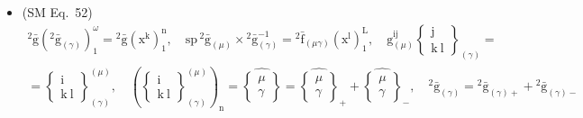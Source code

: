 \documentclass[
    12pt,              %
    a4paper,           %
    headings=normal,   %
    twoside=true,      %
    BCOR=8mm,          %
]{scrbook}
\begin{document}
\begin{itemize}[label={},leftmargin=0pt]
    \item (SM Eq.\ 52) 
    \[
    \begin{gathered}
    {}^2\bar{\mathrm{g}} \left( {}^2\bar{\mathrm{g}}_{(\gamma)} \right)_1^\omega = {}^2\bar{\mathrm{g}}(\mathrm{x^k})_1^\mathrm{n}, \quad \mathrm{sp} \, {}^2\bar{\mathrm{g}}_{(\mu)} \times {}^2\bar{\mathrm{g}}_{(\gamma)}^{-1} = {}^2\bar{\mathrm{f}}_{(\mu\gamma)} (\mathrm{x^l})_1^\mathrm{L}, \quad \mathrm{g}_{(\mu)}^{\mathrm{ij}} \left\{ \begin{smallmatrix} \mathrm{j} \\ \mathrm{k\ l} \end{smallmatrix} \right\}_{(\gamma)} = \\
    = \left\{ \begin{smallmatrix} \mathrm{i} \\ \mathrm{k\ l} \end{smallmatrix} \right\}^{(\mu)}_{(\gamma)}, \quad \left( \left\{ \begin{smallmatrix} \mathrm{i} \\ \mathrm{k\ l} \end{smallmatrix} \right\}^{(\mu)}_{(\gamma)} \right)_\mathrm{n} = \widehat{\left\{ \begin{smallmatrix} \mu \\ \gamma \end{smallmatrix} \right\}} = \widehat{\left\{ \begin{smallmatrix} \mu \\ \gamma \end{smallmatrix} \right\}}_+ + \widehat{\left\{ \begin{smallmatrix} \mu \\ \gamma \end{smallmatrix} \right\}}_-, \quad {}^2\bar{\mathrm{g}}_{(\gamma)} = {}^2\bar{\mathrm{g}}_{(\gamma)+} + {}^2\bar{\mathrm{g}}_{(\gamma)-}
    \end{gathered}
    \]


\end{itemize}
\end{document}
